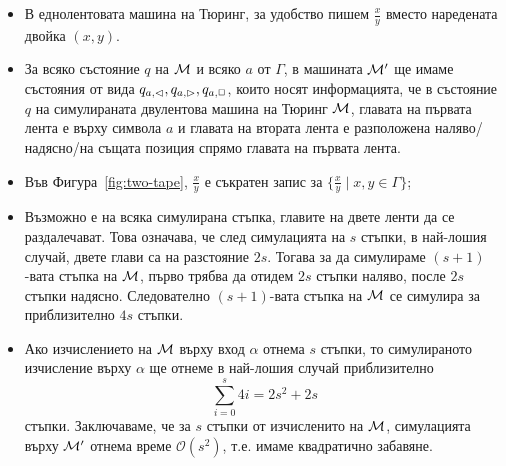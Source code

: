 \begin{itemize}
\item
  В еднолентовата машина на Тюринг, за удобство пишем $\frac{x}{y}$ вместо наредената двойка $(x,y)$.
\item
  За всяко състояние $q$ на $\mathcal{M}$ и всяко $a$ от $\Gamma$, в машината $\mathcal{M}'$ ще имаме състояния от вида 
  $q_{a,\lhd}, q_{a,\rhd}, q_{a,\Box}$, които носят информацията, че в състояние $q$ на симулираната двулентова машина на Тюринг $\mathcal{M}$,
  главата на първата лента е върху символа $a$ и главата на втората лента е разположена наляво/надясно/на същата позиция спрямо главата на първата лента.
\item 
  Във Фигура~\ref{fig:two-tape}, $\frac{x}{y}$ е съкратен запис за $\{\frac{x}{y} \mid x,y \in \Gamma\}$;
\item
  Възможно е на всяка симулирана стъпка, главите на двете ленти да се раздалечават.
  Това означава, че след симулацията на $s$ стъпки, в най-лошия случай, 
  двете глави са на разстояние $2s$. Тогава за да симулираме $(s+1)$-вата стъпка на $\mathcal{M}$,
  първо трябва да отидем $2s$ стъпки наляво, после $2s$ стъпки надясно.
  Следователно $(s+1)$-вата стъпка на $\mathcal{M}$ се симулира за приблизително $4s$ стъпки.
\item
  Ако изчислението на $\mathcal{M}$ върху вход $\alpha$ отнема $s$ стъпки,
  то симулираното изчисление върху $\alpha$ ще отнеме в най-лошия случай приблизително
  \[ \sum^s_{i=0}4i = 2s^2+2s\] стъпки.
  Заключаваме, че за $s$ стъпки от изчисленито на $\mathcal{M}$, симулацията върху $\mathcal{M}'$ отнема време $\mathcal{O}(s^2)$,
  т.е. имаме квадратично забавяне.
\end{itemize}



